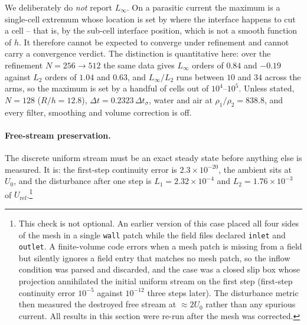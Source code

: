 \documentclass[preprint,3p,11pt]{elsarticle}
\begin{document}
We deliberately do \emph{not} report $L_\infty$. On a parasitic current the maximum is a
single-cell extremum whose location is set by where the interface happens to cut a cell --
that is, by the sub-cell interface position, which is not a smooth function of $h$. It
therefore cannot be expected to converge under refinement and cannot carry a convergence
verdict. The distinction is quantitative here: over the refinement $N=256\to512$ the same
data gives $L_\infty$ orders of $0.84$ and $-0.19$ against $L_2$ orders of $1.04$ and
$0.63$, and $L_\infty/L_2$ runs between $10$ and $34$ across the arms, so the maximum is
set by a handful of cells out of $10^{4}$--$10^{5}$. Unless stated, $N=128$ ($R/h=12.8$),
$\Delta t=0.2323\,\Delta t_\sigma$, water and air at $\rho_1/\rho_2=838.8$, and every
filter, smoothing and volume correction is off.

\paragraph{Free-stream preservation.} The discrete uniform stream must be an exact steady
state before anything else is measured. It is: the first-step continuity error is
$2.3\times10^{-20}$, the ambient sits at $U_0$, and the disturbance after one step is
$L_1=2.32\times10^{-4}$ and $L_2=1.76\times10^{-3}$ of $U_{\mathrm{ref}}$.\footnote{This check is not optional. An earlier version of this case
placed all four sides of the mesh in a single \texttt{wall} patch while the field files
declared \texttt{inlet} and \texttt{outlet}. A finite-volume code errors when a mesh patch
is missing from a field but silently ignores a field entry that matches no mesh patch, so
the inflow condition was parsed and discarded, and the case was a closed slip box whose
projection annihilated the initial uniform stream on the first step (first-step continuity
error $10^{-5}$ against $10^{-12}$ three steps later). The disturbance metric then measured
the destroyed free stream at $\approx 2U_0$ rather than any spurious current. All results
in this section were re-run after the mesh was corrected.}
\end{document}
